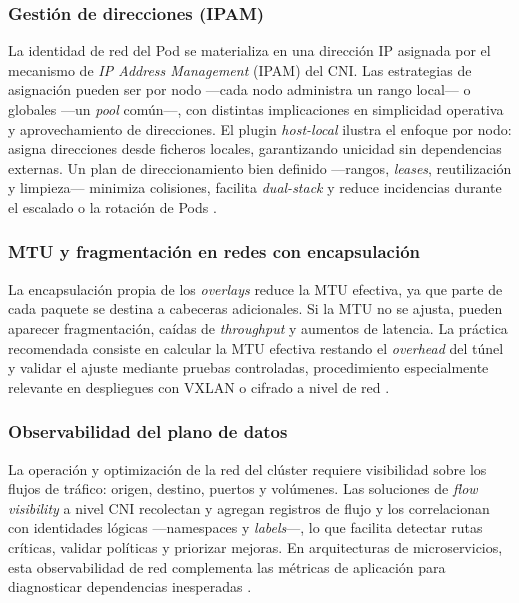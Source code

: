 \subsubsection{Gestión de direcciones (IPAM)}

La identidad de red del Pod se materializa en una dirección IP asignada por el mecanismo de \emph{IP Address Management} (IPAM) del CNI. Las estrategias de asignación pueden ser por nodo ---cada nodo administra un rango local--- o globales ---un \emph{pool} común---, con distintas implicaciones en simplicidad operativa y aprovechamiento de direcciones. El plugin \emph{host-local} ilustra el enfoque por nodo: asigna direcciones desde ficheros locales, garantizando unicidad sin dependencias externas. Un plan de direccionamiento bien definido ---rangos, \emph{leases}, reutilización y limpieza--- minimiza colisiones, facilita \emph{dual-stack} y reduce incidencias durante el escalado o la rotación de Pods \cite{ref18,ref20}.

\subsubsection{MTU y fragmentación en redes con encapsulación}

La encapsulación propia de los \emph{overlays} reduce la MTU efectiva, ya que parte de cada paquete se destina a cabeceras adicionales. Si la MTU no se ajusta, pueden aparecer fragmentación, caídas de \emph{throughput} y aumentos de latencia. La práctica recomendada consiste en calcular la MTU efectiva restando el \emph{overhead} del túnel y validar el ajuste mediante pruebas controladas, procedimiento especialmente relevante en despliegues con VXLAN o cifrado a nivel de red \cite{ref12}.

\subsubsection{Observabilidad del plano de datos}

La operación y optimización de la red del clúster requiere visibilidad sobre los flujos de tráfico: origen, destino, puertos y volúmenes. Las soluciones de \emph{flow visibility} a nivel CNI recolectan y agregan registros de flujo y los correlacionan con identidades lógicas ---namespaces y \emph{labels}---, lo que facilita detectar rutas críticas, validar políticas y priorizar mejoras. En arquitecturas de microservicios, esta observabilidad de red complementa las métricas de aplicación para diagnosticar dependencias inesperadas \cite{ref23,ref6}.

